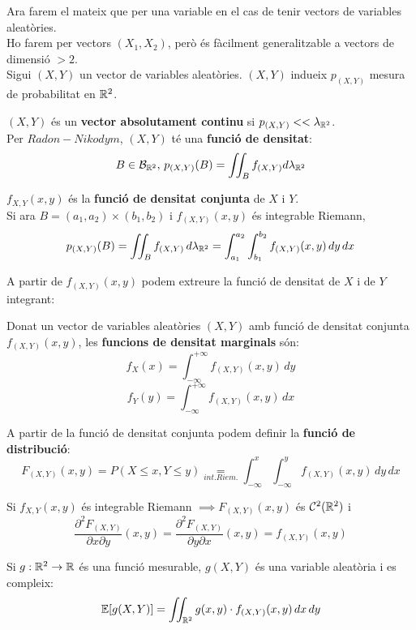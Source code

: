 Ara farem el mateix que per una variable en el cas de tenir vectors de variables aleatòries.\\
Ho farem per vectors $(X_{1},X_{2})$, però és fàcilment generalitzable a vectors de dimensió $> 2$. \\
Sigui $(X,Y)$ un vector de variables aleatòries. $(X,Y)$ indueix $p_{(X,Y)}$ mesura de probabilitat en $\mathbb{R}^{2}$.

\begin{defi}
  $(X,Y)$ és un \textbf{vector absolutament continu} si $p_{(X,Y)}<<\lambda_{\mathbb{R}^{2}}$. \\
  Per $Radon-Nikodym$, $(X,Y)$ té una \textbf{funció de densitat}:
  \[
    B\in\mathcal{B}_{\mathbb{R}^{2}}, \, p_{(X,Y)}(B)=\iint_{B}f_{(X,Y)}d\lambda_{\mathbb{R}^{2}}
  \]
\end{defi}

\begin{defi}
  $f_{X,Y}(x,y)$ és la \textbf{funció de densitat conjunta} de $X$ i $Y$.\\
  Si ara $B=(a_{1},a_{2})\times(b_{1},b_{2})$ i $f_{(X,Y)}(x,y)$ és integrable Riemann, 
  \[
    p_{(X,Y)}(B)=\iint_{B}f_{(X,Y)}\,d\lambda_{\mathbb{R}^{2}}=\int_{a_{1}}^{a_{2}}\int_{b_{1}}^{b_{2}}f_{(X,Y)}(x,y)\,dy\,dx
  \]
\end{defi}

A partir de $f_{(X,Y)}(x,y)$ podem extreure la funció de densitat de $X$ i de $Y$ integrant:

\begin{defi}
  Donat un vector de variables aleatòries $(X,Y)$ amb funció de densitat conjunta $f_{(X,Y)}(x,y)$, les \textbf{funcions de densitat marginals} són:
  \[
    f_{X}(x) = \int_{-\infty}^{+\infty}f_{(X,Y)}(x,y) \, dy
  \]
  \[
    f_{Y}(y) = \int_{-\infty}^{+\infty}f_{(X,Y)}(x,y) \, dx
  \]
\end{defi}

A partir de la funció de densitat conjunta podem definir la \textbf{funció de distribució}: 
\[
  F_{(X,Y)}(x,y) = P(X \leq x, Y \leq y) \underset{int. Riem.}{=} \int_{-\infty}^{x}\int_{-\infty}^{y} f_{(X,Y)}(x,y) \, dy \, dx
\]

\begin{obs}
  Si $f_{X,Y}(x,y)$ és integrable Riemann $\implies F_{(X,Y)}(x,y)$ és $\mathcal{C}^{2}(\mathbb{R}^{2})$ i
  \[
    \frac{\partial^{2}F_{(X,Y)}}{\partial x \partial y}(x,y) = \frac{\partial^{2}F_{(X,Y)}}{\partial y \partial x}(x,y) = f_{(X,Y)}(x,y)
  \]
\end{obs}

\begin{obs}
  Si $g:\mathbb{R}^{2} \to \mathbb{R}$ és una funció mesurable, $g(X,Y)$ és una variable aleatòria i es compleix:
  \[
    \mathbb{E}[g(X,Y)] = \iint_{\mathbb{R}^{2}} g(x,y)\cdot f_{(X,Y)}(x,y) \, dx \, dy
  \]
\end{obs}


